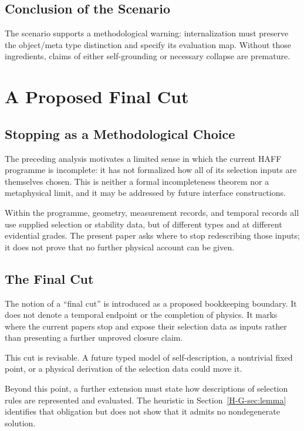 \documentclass[12pt,a4paper,openany]{book}
\begin{document}
\subsection{Conclusion of the Scenario}

The scenario supports a methodological warning: internalization must preserve the object/meta type distinction and specify its evaluation map.  Without those ingredients, claims of either self-grounding or necessary collapse are premature.

\section{A Proposed Final Cut}
\label{H-G-sec:cut}

\subsection{Stopping as a Methodological Choice}

The preceding analysis motivates a limited sense in which the current HAFF programme is incomplete: it has not formalized how all of its selection inputs are themselves chosen.  This is neither a formal incompleteness theorem nor a metaphysical limit, and it may be addressed by future interface constructions.

Within the programme, geometry, measurement records, and temporal records all use supplied selection or stability data, but of different types and at different evidential grades.  The present paper asks where to stop redescribing those inputs; it does not prove that no further physical account can be given.

\subsection{The Final Cut}

The notion of a ``final cut'' is introduced as a proposed bookkeeping boundary. It does not denote a temporal endpoint or the completion of physics.  It marks where the current papers stop and expose their selection data as inputs rather than presenting a further unproved closure claim.

This cut is revisable.  A future typed model of self-description, a nontrivial fixed point, or a physical derivation of the selection data could move it.

Beyond this point, a further extension must state how descriptions of selection rules are represented and evaluated.  The heuristic in Section~\ref{H-G-sec:lemma} identifies that obligation but does not show that it admits no nondegenerate solution.
\end{document}
